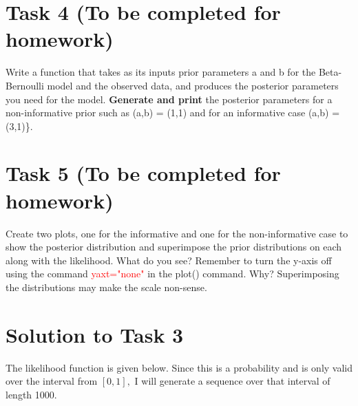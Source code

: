 \documentclass[
]{article}
\begin{document}
\hypertarget{task-4-to-be-completed-for-homework}{%
\section{Task 4 (To be completed for
homework)}\label{task-4-to-be-completed-for-homework}}

Write a function that takes as its inputs prior parameters \textsf{a}
and \textsf{b} for the Beta-Bernoulli model and the observed data, and
produces the posterior parameters you need for the model.
\textbf{Generate and print} the posterior parameters for a
non-informative prior such as \textsf{(a,b) = (1,1)} and for an
informative case \textsf{(a,b) = (3,1)}\}.

\hypertarget{task-5-to-be-completed-for-homework}{%
\section{Task 5 (To be completed for
homework)}\label{task-5-to-be-completed-for-homework}}

Create two plots, one for the informative and one for the
non-informative case to show the posterior distribution and superimpose
the prior distributions on each along with the likelihood. What do you
see? Remember to turn the y-axis off using the command
\textcolor{red}{yaxt="none"} in the plot() command. Why? Superimposing
the distributions may make the scale non-sense.

\newpage

\hypertarget{solution-to-task-3}{%
\section{Solution to Task 3}\label{solution-to-task-3}}

The likelihood function is given below. Since this is a probability and
is only valid over the interval from \([0, 1],\) I will generate a
sequence over that interval of length 1000.
\end{document}
